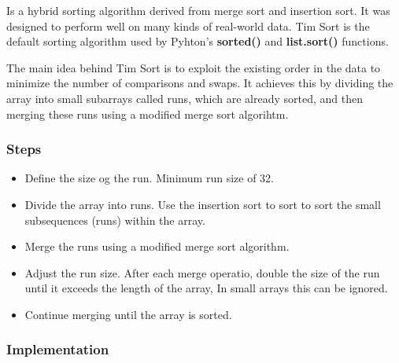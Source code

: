 Is a hybrid sorting algorithm derived from merge sort and insertion sort. It was designed to perform well on many kinds of real-world data. Tim Sort is the default sorting algorithm used by Pyhton's \textbf{sorted()} and \textbf{list.sort()} functions.

The main idea behind Tim Sort is to exploit the existing order in the data to minimize the number of comparisons and swaps. It achieves this by dividing the array into small subarrays called runs, which are already sorted, and then merging these runs using a modified merge sort algorihtm.

\subsubsection*{Steps}

\begin{itemize}
  \item Define the size og the run. Minimum run size of 32.
  \item Divide the array into runs. Use the insertion sort to sort to sort the small subsequences (runs) within the array.
  \item Merge the runs using a modified merge sort algorithm.
  \item Adjust the run size. After each merge operatio, double the size of the run until it exceeds the length of the array, In small arrays this can be ignored.
  \item Continue merging until the array is sorted.
\end{itemize}

\subsubsection*{Implementation}

